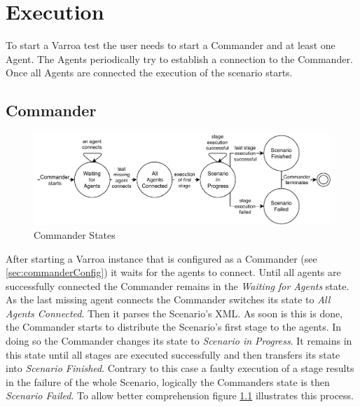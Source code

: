 \chapter{Execution}\label{sec:Execution}
To start a Varroa test the user needs to start a Commander and at least one Agent.
The Agents periodically try to establish a connection to the Commander.
Once all Agents are connected the execution of the scenario starts.
\textsl{}
\section{Commander}
\begin{figure}[H]
	\begin{center}
	\includegraphics[scale=0.9]{Resources/PDF/CommanderStates}
	\caption{Commander States}
	\label{pic:CommanderStates}
	\end{center}
\end{figure}
After starting a Varroa instance that is configured as a Commander (see \ref{sec:commanderConfig}) it waits for the agents to connect.
Until all agents are successfully connected the Commander remains in the \emph{Waiting for Agents} state.
As the last missing agent connects the Commander switches its state to \emph{All Agents Connected}.
Then it parses the Scenario's XML. As soon is this is done, the Commander starts to distribute the Scenario's first stage to the agents.
In doing so the Commander changes its state to \emph{Scenario in Progress}.
It remains in this state until all stages are executed successfully and then transfers its state into \emph{Scenario Finished}.
Contrary to this case a faulty execution of a stage results in the failure of the whole Scenario, logically the Commanders state is then \emph{Scenario Failed}.
To allow better comprehension figure \ref{pic:CommanderStates} illustrates this process.

